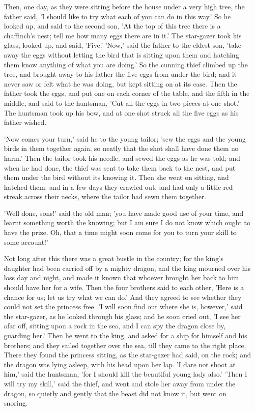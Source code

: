 \documentclass[12pt]{book}
\begin{document}
Then, one day, as they were sitting before the house under a very high
tree, the father said, 'I should like to try what each of you can do
in this way.' So he looked up, and said to the second son, 'At the top
of this tree there is a chaffinch's nest; tell me how many eggs there
are in it.' The star-gazer took his glass, looked up, and said,
'Five.' 'Now,' said the father to the eldest son, 'take away the eggs
without letting the bird that is sitting upon them and hatching them
know anything of what you are doing.' So the cunning thief climbed up
the tree, and brought away to his father the five eggs from under the
bird; and it never saw or felt what he was doing, but kept sitting on
at its ease. Then the father took the eggs, and put one on each corner
of the table, and the fifth in the middle, and said to the huntsman,
'Cut all the eggs in two pieces at one shot.' The huntsman took up his
bow, and at one shot struck all the five eggs as his father wished.

'Now comes your turn,' said he to the young tailor; 'sew the eggs and
the young birds in them together again, so neatly that the shot shall
have done them no harm.' Then the tailor took his needle, and sewed
the eggs as he was told; and when he had done, the thief was sent to
take them back to the nest, and put them under the bird without its
knowing it. Then she went on sitting, and hatched them: and in a few
days they crawled out, and had only a little red streak across their
necks, where the tailor had sewn them together.

'Well done, sons!' said the old man; 'you have made good use of your
time, and learnt something worth the knowing; but I am sure I do not
know which ought to have the prize. Oh, that a time might soon come
for you to turn your skill to some account!'

Not long after this there was a great bustle in the country; for the
king's daughter had been carried off by a mighty dragon, and the king
mourned over his loss day and night, and made it known that whoever
brought her back to him should have her for a wife. Then the four
brothers said to each other, 'Here is a chance for us; let us try what
we can do.' And they agreed to see whether they could not set the
princess free. 'I will soon find out where she is, however,' said the
star-gazer, as he looked through his glass; and he soon cried out, 'I
see her afar off, sitting upon a rock in the sea, and I can spy the
dragon close by, guarding her.' Then he went to the king, and asked
for a ship for himself and his brothers; and they sailed together over
the sea, till they came to the right place. There they found the
princess sitting, as the star-gazer had said, on the rock; and the
dragon was lying asleep, with his head upon her lap. 'I dare not shoot
at him,' said the huntsman, 'for I should kill the beautiful young
lady also.' 'Then I will try my skill,' said the thief, and went and
stole her away from under the dragon, so quietly and gently that the
beast did not know it, but went on snoring.
\end{document}
